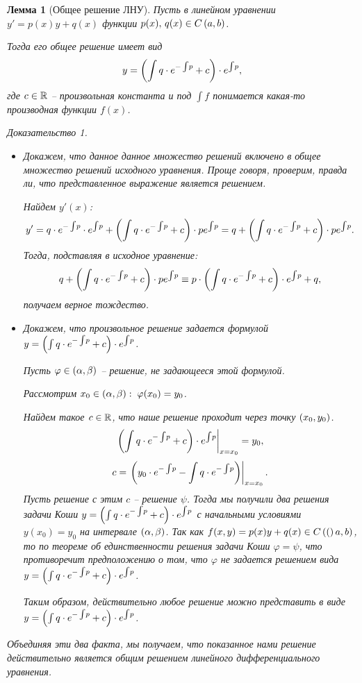 \documentclass[a5paper, 10pt]{article}
\theoremstyle{definition}
\theoremstyle{plain}
\newtheorem{Lem}{Лемма}
\theoremstyle{remark}
\newtheorem*{Proof}{Доказательство}
\begin{document}
	\begin{Lem}[Общее решение ЛНУ]
		Пусть в линейном уравнении $y' = p(x) y + q(x)$ функции $p(x),\, q(x) \in C\left(a,b\right)$.
		
		Тогда его общее решение имеет вид \begin{equation}
			y = \left(\int q \cdot e^{-\int\!p} + c\right) \cdot e^{\int \! p},
		\end{equation}
		где $c\in \mathbb{R}$ -- произвольная константа и под $\int \!f$ понимается какая-то производная функции $f(x)$.
		\begin{Proof}
			\begin{itemize}
				\item Докажем, что данное данное множество решений включено в общее множество решений исходного уравнения. Проще говоря, проверим, правда ли, что представленное выражение является решением.
				
				Найдем $y'(x)$:
				\[
				y' = q\cdot e^{-\int\! p} \cdot e^{\int\!p} + \left(\int q\cdot e^{-\int\!p} + c\right) \cdot p e^{\int\!p} = q + \left(\int q\cdot e^{-\int\!p} + c\right) \cdot p e^{\int\!p}.
				\]
				Тогда, подставляя в исходное уравнение:
				\[
				q + \left(\int q\cdot e^{-\int\!p} + c\right) \cdot p e^{\int\!p} \equiv p \cdot \left(\int q \cdot e^{-\int\!p} + c\right) \cdot e^{\int \! p} + q,
				\]
				получаем верное тождество.
				\item Докажем, что произвольное решение задается формулой $y = \left(\int q \cdot e^{-\int\!p} + c\right) \cdot e^{\int \! p}$.
				
				Пусть $\varphi \in \left(\alpha,\beta\right)$ -- решение, не задающееся этой формулой.
				
				Рассмотрим $x_0 \in \left(\alpha, \beta\right) : \; \varphi(x_0) = y_0$.
				
				Найдем такое $c \in \mathbb{R}$, что наше решение проходит через точку $\left(x_0, y_0\right)$. 
				\[
				\left. \left(\int q \cdot e^{-\int\!p} + c\right) \cdot e^{\int \! p} \right|_{x=x_0} = y_0,
				\]
				\[
				c = \left. \left(y_0 \cdot e^{-\int\!p} - \int q\cdot e^{-\int\!p}\right) \right|_{x=x_0}.
				\]
				Пусть решение с этим $c$ -- решение $\psi$. Тогда мы получили два решения задачи Коши $y = \left(\int q \cdot e^{-\int\!p} + c\right) \cdot e^{\int \! p}$ с начальными условиями $y(x_0) = y_0$ на интервале $\left(\alpha,\beta\right)$. Так как $f(x, y) = p(x) y+q(x) \in C\left((\right)a,b)$, то по теореме об единственности решения задачи Коши $\varphi = \psi$, что противоречит предположению о том, что $\varphi$ не задается решением вида $	y = \left(\int q \cdot e^{-\int\!p} + c\right) \cdot e^{\int \! p}$. 
				
				Таким образом, действительно любое решение можно представить в виде $y = \left(\int q \cdot e^{-\int\!p} + c\right) \cdot e^{\int \! p}$.
			\end{itemize}
			Объединяя эти два факта, мы получаем, что показанное нами решение действительно является общим решением линейного дифференциального уравнения.
		\end{Proof}
	\end{Lem}
	
\end{document}

